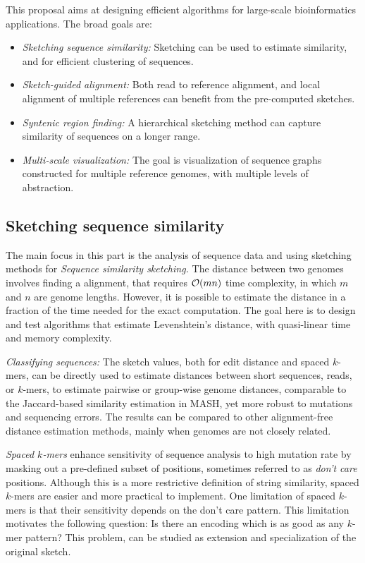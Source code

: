 
This proposal aims at designing efficient algorithms for large-scale bioinformatics applications. The broad goals are:
\begin{itemize}
    \item  \textit{Sketching sequence similarity:} Sketching can be used to estimate similarity, and  for efficient clustering of sequences.
    \item \textit{Sketch-guided alignment:} Both read to reference alignment, and local alignment of multiple references can benefit from the pre-computed sketches.
    \item \textit{Syntenic region finding:} A hierarchical sketching method can capture similarity of sequences on a longer range.
    \item \textit{Multi-scale visualization: } The goal is visualization of sequence graphs constructed for multiple reference genomes, with multiple levels of abstraction.
\end{itemize}


\subsection{Sketching sequence similarity}
The main focus in this part is the analysis of sequence data and using sketching methods for 
\emph{Sequence similarity sketching.} The distance between two genomes involves finding a alignment, that requires $\mathcal{O}(mn)$ time complexity, in which $m$ and $n$ are genome lengths. However, it is possible to estimate the distance in a fraction of the time needed for the exact computation. The goal here is to design and test algorithms that estimate Levenshtein's distance, with quasi-linear time and memory complexity. 

 \emph{Classifying sequences:} The sketch values, both for edit distance and spaced $k$-mers, can be directly used to estimate distances between short sequences, reads, or $k$-mers, to estimate pairwise or group-wise genome distances, comparable to the Jaccard-based similarity estimation in MASH\cite{ondov2016mash}, yet more robust to mutations and sequencing errors. The results can be compared to other alignment-free distance estimation methods, mainly when genomes are not closely related. 

\textit{Spaced $k$-mers} enhance sensitivity of sequence analysis to high mutation rate by masking out a pre-defined subset of positions, sometimes referred to as \emph{don't care} positions. Although this is a more restrictive definition of string similarity, spaced $k$-mers are easier and more practical to implement. One limitation of spaced $k$-mers is that their sensitivity depends on the don't care pattern. This limitation motivates the following question: Is there an encoding which is as good as any $k$-mer pattern? This problem, can be studied as extension and specialization of the original sketch.  


